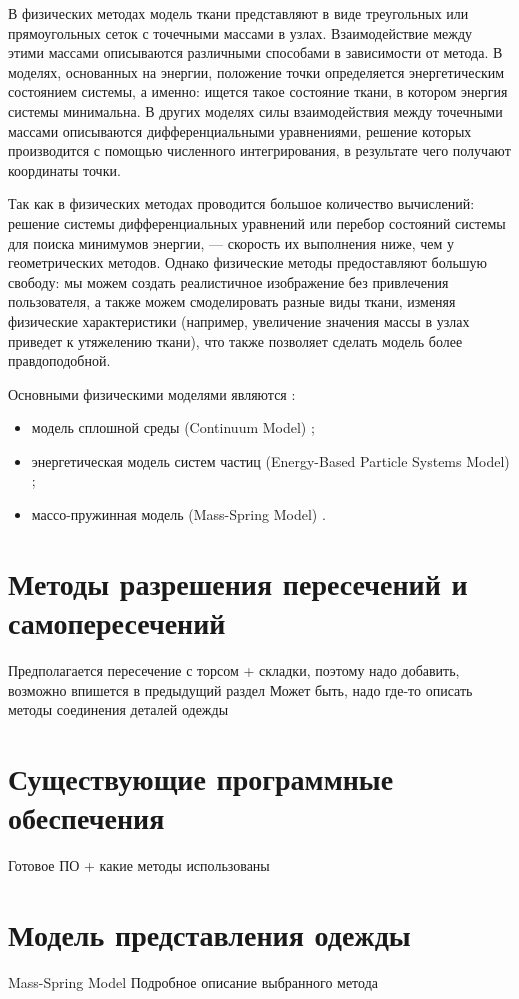 В физических методах модель ткани представляют в виде  треугольных или
прямоугольных сеток с точечными массами в узлах. Взаимодействие между этими
массами  описываются различными способами в зависимости от метода. В моделях,
основанных на энергии, положение точки определяется энергетическим состоянием
системы, а именно: ищется такое состояние ткани, в котором энергия системы
минимальна. В других моделях силы взаимодействия между точечными массами
описываются дифференциальными уравнениями, решение которых производится с
помощью численного интегрирования, в результате чего получают координаты точки.
\cite{bib07}

Так как в физических методах проводится большое количество вычислений: решение
системы дифференциальных уравнений или перебор состояний системы для поиска
минимумов энергии, --- скорость их выполнения ниже, чем у геометрических
методов. Однако физические методы предоставляют большую свободу: мы можем
создать реалистичное изображение без привлечения пользователя, а также можем
смоделировать разные виды ткани, изменяя физические характеристики (например,
увеличение значения массы в узлах приведет к утяжелению ткани), что также
позволяет сделать модель более правдоподобной. \cite{bib07}

Основными физическими моделями являются \cite{bib11}:
\begin{itemize}[left=\parindent]
    \item модель сплошной среды (Continuum Model) \cite{bib12};
    \item энергетическая модель систем частиц (Energy-Based Particle Systems Model) \cite{bib13};
    \item массо-пружинная модель (Mass-Spring Model) \cite{bib14}.
\end{itemize}

\section{Методы разрешения пересечений и самопересечений}

Предполагается пересечение с торсом + складки, поэтому надо добавить, возможно
впишется в предыдущий раздел
Может быть, надо где-то описать методы соединения деталей одежды

\section{Существующие программные обеспечения}

Готовое ПО + какие методы использованы

\section{Модель представления одежды}

Mass-Spring Model 
Подробное описание выбранного метода
